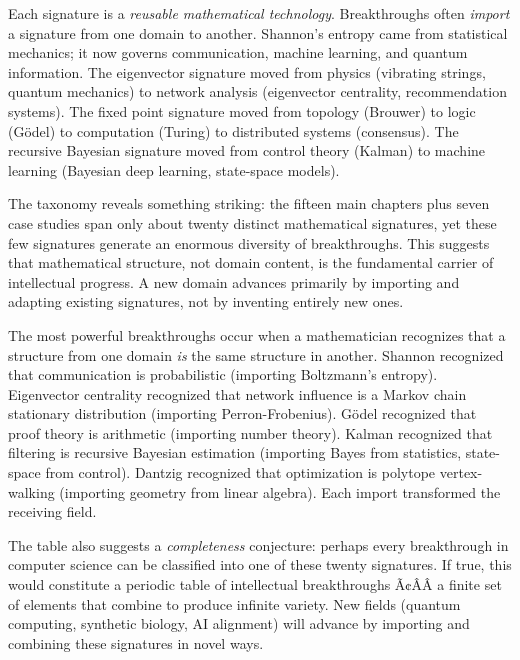 Each signature is a \emph{reusable mathematical technology}. Breakthroughs often \emph{import} a signature from one domain to another. Shannon's entropy came from statistical mechanics; it now governs communication, machine learning, and quantum information. The eigenvector signature moved from physics (vibrating strings, quantum mechanics) to network analysis (eigenvector centrality, recommendation systems). The fixed point signature moved from topology (Brouwer) to logic (G\"odel) to computation (Turing) to distributed systems (consensus). The recursive Bayesian signature moved from control theory (Kalman) to machine learning (Bayesian deep learning, state-space models).

The taxonomy reveals something striking: the fifteen main chapters plus seven case studies span only about twenty distinct mathematical signatures, yet these few signatures generate an enormous diversity of breakthroughs. This suggests that mathematical structure, not domain content, is the fundamental carrier of intellectual progress. A new domain advances primarily by importing and adapting existing signatures, not by inventing entirely new ones.

\begin{connectionbox}
The most powerful breakthroughs occur when a mathematician recognizes that a structure from one domain \emph{is} the same structure in another. Shannon recognized that communication is probabilistic (importing Boltzmann's entropy). Eigenvector centrality recognized that network influence is a Markov chain stationary distribution (importing Perron-Frobenius). G\"odel recognized that proof theory is arithmetic (importing number theory). Kalman recognized that filtering is recursive Bayesian estimation (importing Bayes from statistics, state-space from control). Dantzig recognized that optimization is polytope vertex-walking (importing geometry from linear algebra). Each import transformed the receiving field.

\end{connectionbox}

The table also suggests a \emph{completeness} conjecture: perhaps every breakthrough in computer science can be classified into one of these twenty signatures. If true, this would constitute a periodic table of intellectual breakthroughs Ã¢ÂÂ a finite set of elements that combine to produce infinite variety. New fields (quantum computing, synthetic biology, AI alignment) will advance by importing and combining these signatures in novel ways.

